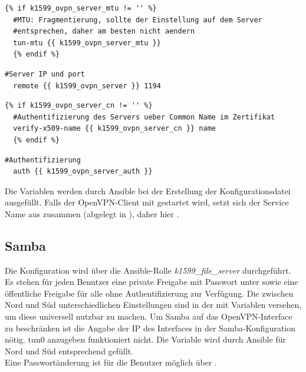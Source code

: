 \begin{lstlisting}[label=code:tunnelmtu,caption=Tunnel-MTU]
  {% if k1599_ovpn_server_mtu != '' %}
  #MTU: Fragmentierung, sollte der Einstellung auf dem Server
  #entsprechen, daher am besten nicht aendern
  tun-mtu {{ k1599_ovpn_server_mtu }}
  {% endif %}
\end{lstlisting}

\begin{lstlisting}[label=code:vpnserver,caption=OpenVPN-Server]
  #Server IP und port
  remote {{ k1599_ovpn_server }} 1194
\end{lstlisting}

\begin{lstlisting}[label=code:certtitle,caption=Zertifikats-Betreff]
  {% if k1599_ovpn_server_cn != '' %}
  #Authentifizierung des Servers ueber Common Name im Zertifikat
  verify-x509-name {{ k1599_ovpn_server_cn }} name
  {% endif %}
\end{lstlisting}

\begin{lstlisting}[label=code:authmethod,caption=Authentifizierungsmethode]
  #Authentifizierung
  auth {{ k1599_ovpn_server_auth }}
\end{lstlisting}

Die Variablen  werden durch Ansible bei der Erstellung der Konfigurationsdatei ausgefüllt. Falls der OpenVPN-Client mit  gestartet wird, setzt sich der Service Name aus  zusammen (abgelegt in ), daher hier .

\subsection{Samba}
Die Konfiguration wird über die Ansible-Rolle \textit{k1599\_file\_server} durchgeführt. Es stehen für jeden Benutzer eine private Freigabe mit Passwort unter  sowie eine öffentliche Freigabe  für alle ohne Authentifizierung zur Verfügung. Die zwischen Nord und Süd unterschiedlichen Einstellungen sind in der  mit Variablen versehen, um diese universell nutzbar zu machen. Um Samba auf das OpenVPN-Interface zu beschränken ist die Angabe der IP des Interfaces in der Samba-Konfiguration nötig. tun0 anzugeben funktioniert nicht. Die Variable wird durch Ansible für Nord und Süd entsprechend gefüllt.\\

Eine Passwortänderung ist für die Benutzer möglich über
.

